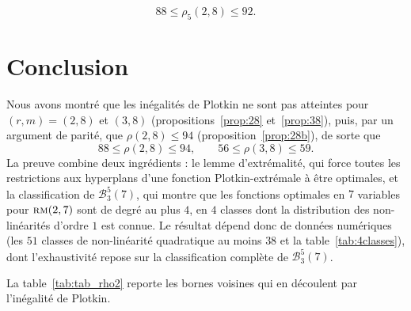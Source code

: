 \documentclass[11pt,a4paper]{article}
\def\bst(#1,#2,#3){\mathcal{B}_{#1}^{#2}(#3)}
\def\rmc(#1,#2){ \textsc {rm}(#1,#2) }
\theoremstyle{plain}
\theoremstyle{definition}
\theoremstyle{remark}
\begin{document}
$$88\le\rho_5(2,8)\le 92.$$ 


\section{Conclusion}

Nous avons montré que les inégalités de Plotkin ne sont pas atteintes pour
$(r,m)=(2,8)$ et $(3,8)$ (propositions~\ref{prop:28} et~\ref{prop:38}), puis, par
un argument de parité, que $\rho(2,8)\le 94$ (proposition~\ref{prop:28b}), de sorte que
$$
88\le\rho(2,8)\le 94,\qquad 56\le\rho(3,8)\le 59.
$$
La preuve combine deux ingrédients : le lemme d'extrémalité, qui force toutes
les restrictions aux hyperplans d'une fonction Plotkin-extrémale à être
optimales, et la classification de $\bst(3,5,7)$, qui montre que les fonctions
optimales en $7$ variables pour $\rmc(2,7)$ sont de degré au plus $4$, en $4$
classes dont la distribution des non-linéarités d'ordre $1$ est connue. Le
résultat dépend donc de données numériques (les $51$ classes de
non-linéarité quadratique au moins $38$ et la table~\ref{tab:4classes}), dont
l'exhaustivité repose sur la classification complète de $\bst(3,5,7)$.


La table~\ref{tab:tab_rho2} reporte les bornes voisines qui en
découlent par l'inégalité de Plotkin.
\end{document}
